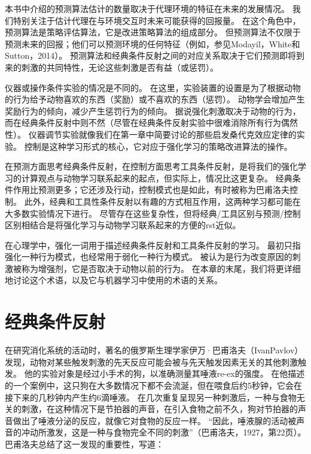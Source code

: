 本书中介绍的预测算法估计的数量取决于代理环境的特征在未来的发展情况。
我们特别关注于估计代理在与环境交互时未来可能获得的回报量。
在这个角色中，预测算法是策略评估算法，它是改进策略算法的组成部分。
但预测算法不仅限于预测未来的回报；他们可以预测环境的任何特征（例如，参见Modayil，White和Sutton，2014）。
预测算法和经典条件反射之间的对应关系取决于它们预测即将到来的刺激的共同特性，无论这些刺激是否有益（或惩罚）。


仪器或操作条件实验的情况是不同的。
在这里，实验装置的设置是为了根据动物的行为给予动物喜欢的东西（奖励）或不喜欢的东西（惩罚）。
动物学会增加产生奖励行为的倾向，减少产生惩罚行为的倾向。
据说强化刺激取决于动物的行为，而在经典条件反射中则不然（尽管在经典条件反射实验中很难消除所有行为偶然性）。
仪器调节实验就像我们在第一章中简要讨论的那些启发桑代克效应定律的实验。
控制是这种学习形式的核心，它对应于强化学习的策略改进算法的操作。


在预测方面思考经典条件反射，在控制方面思考工具条件反射，是将我们的强化学习的计算观点与动物学习联系起来的起点，但实际上，情况比这更复杂。
经典条件作用比预测更多；它还涉及行动，控制模式也是如此，有时被称为巴甫洛夫控制。
此外，经典和工具性条件反射以有趣的方式相互作用，这两种学习都可能在大多数实验情况下进行。
尽管存在这些复杂性，但将经典/工具区别与预测/控制区别相结合是将强化学习与动物学习联系起来的方便的rst近似。


在心理学中，强化一词用于描述经典条件反射和工具条件反射的学习。
最初只指强化一种行为模式，也经常用于弱化一种行为模式。
被认为是行为改变原因的刺激被称为增强剂，它是否取决于动物以前的行为。
在本章的末尾，我们将更详细地讨论这个术语，以及它与机器学习中使用的术语的关系。


\section{经典条件反射} \label{sec:classical_conditioning}

在研究消化系统的活动时，著名的俄罗斯生理学家伊万·巴甫洛夫（IvanPavlov）发现，动物对某些触发刺激的先天反应可能会被与先天触发因素无关的其他刺激触发。
他的实验对象是经过小手术的狗，以准确测量其唾液re-ex的强度。
在他描述的一个案例中，这只狗在大多数情况下都不会流涎，但在喂食后约5秒钟，它会在接下来的几秒钟内产生约6滴唾液。
在几次重复呈现另一种刺激后，一种与食物无关的刺激，在这种情况下是节拍器的声音，在引入食物之前不久，狗对节拍器的声音做出了唾液分泌的反应，就像它对食物的反应一样。
“因此，唾液腺的活动被声音的冲动所激发，这是一种与食物完全不同的刺激”（巴甫洛夫，1927，第22页）。
巴甫洛夫总结了这一发现的重要性，写道：


